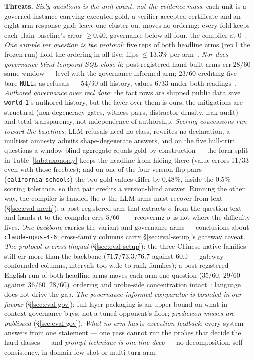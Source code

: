 \smallskip\noindent{}\textbf{Threats.} \emph{Sixty questions is the unit
count, not the evidence mass}: each unit is a governed instance carrying
executed gold, a verifier-accepted certificate and an eight-arm response
grid; leave-one-cluster-out moves no ordering:
every fold keeps each plain baseline's error ${\geq}0.40$, governance below
all four, the compiler at
$0$~\cite{asofgov-tr}. \emph{One sample per question is the protocol}: five
reps of both headline arms (rep\,1 the frozen run) hold the ordering in all
five, flips ${\leq}13.3\%$ per
arm~\cite{asofgov-tr}. \emph{Nor does governance-blind temporal-SQL close
it}: post-registered hand-built arms err $28/60$ same-window --- level
with the governance-informed arm; $23/60$ crediting five bare
\texttt{NULL}s as refusals --- $54/60$ all-history, values $6/33$ under
both readings~\cite{asofgov-tr}. \emph{Authored governance over real
data}: the fact rows are shipped public data save \texttt{world\_1}'s
authored history, but the layer over them is ours; the mitigations are
structural (non-degeneracy gates, witness pairs, distractor density, leak
audit) and total transparency, not independence of authorship.
\emph{Scoring concessions run toward the baselines}: LLM refusals need no
class, rewrites no declaration, a multiset amnesty admits shape-degenerate
answers, and on the five hull-trim questions a window-blind aggregate equals
gold by construction --- the form split in Table~\ref{tab:taxonomy} keeps the
headline from hiding there (value errors 11/33
even with those freebies); and on one of the four version-flip pairs
(\texttt{california\_schools}) the two gold values differ by $0.48\%$, inside
the $0.5\%$ scoring tolerance, so that pair credits a version-blind answer.
Running the other way, the compiler is handed the $\sigma$ the LLM arms must
recover from text (\S\ref{sec:eval-mech}); a post-registered arm that
extracts $\sigma$ from the question text and hands it to the compiler errs
$5/60$~\cite{asofgov-tr} --- recovering $\sigma$ is not where the difficulty
lives.
\emph{One backbone} carries the variant and governance arms --- conclusions
about \texttt{claude-opus-4-6}; cross-family columns carry
\S\ref{sec:eval-setup}'s gateway caveat. \emph{The protocol is
cross-lingual} (\S\ref{sec:eval-setup}): the three Chinese-native families
still err more than the backbone ($71.7/73.3/76.7$ against $60.0$ ---
gateway-confounded columns, intervals too wide to rank families); a
post-registered English run of both headline arms moves each arm one
question ($35/60$, $29/60$ against $36/60$, $28/60$), ordering and
probe-side concentration intact~\cite{asofgov-tr}: language does not drive
the gap. \emph{The
governance-informed comparator is bounded in our favour}
(\S\ref{sec:eval-gov}): full-layer packaging is an upper bound on what
in-context governance buys, not a tuned opponent's floor; \emph{prediction misses are published} (\S\ref{sec:eval-gov}).
\emph{What no arm has} is
\emph{execution feedback}: every system answers from one statement --- one
pass cannot run the probes that decide the hard classes --- and \emph{prompt
technique is one line deep} --- no decomposition, self-consistency, in-domain
few-shot or multi-turn arm.
